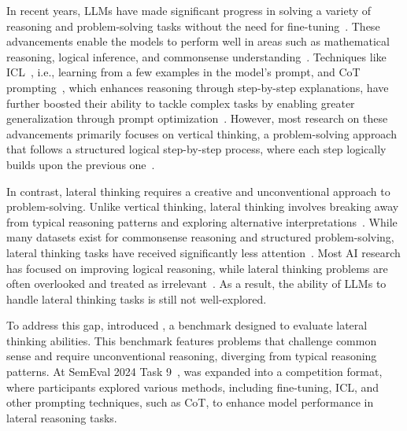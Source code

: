 In recent years, \acp{LLM} have made significant progress in solving a variety of reasoning and problem-solving tasks without the need for fine-tuning~\cite{radfordLanguageModelsAre2019}. These advancements enable the models to perform well in areas such as mathematical reasoning, logical inference, and commonsense understanding~\cite{panLogicLMEmpoweringLarge2023, qiaoReasoningLanguageModel2023, naveedComprehensiveOverviewLarge2024}. Techniques like \ac{ICL}~\cite{brownLanguageModelsAre2020}, i.e., learning from a few examples in the model's prompt, and \ac{CoT} prompting~\cite{weiChainofThoughtPromptingElicits2023}, which enhances reasoning through step-by-step explanations, have further boosted their ability to tackle complex tasks by enabling greater generalization through prompt optimization~\cite{brownLanguageModelsAre2020,weiChainofThoughtPromptingElicits2023}. However, most research on these advancements primarily focuses on vertical thinking, a problem-solving approach that follows a structured logical step-by-step process, where each step logically builds upon the previous one~\cite{jiangBRAINTEASERLateralThinking2023}.

In contrast, lateral thinking requires a creative and unconventional approach to problem-solving. Unlike vertical thinking, lateral thinking involves breaking away from typical reasoning patterns and exploring alternative interpretations~\cite{jiangBRAINTEASERLateralThinking2023, jiangSemEval2024Task92024}. While many datasets exist for commonsense reasoning and structured problem-solving, lateral thinking tasks have received significantly less attention~\cite{jiangBRAINTEASERLateralThinking2023, jiangSemEval2024Task92024}. Most AI research has focused on improving logical reasoning, while lateral thinking problems are often overlooked and treated as irrelevant~\cite{jiangBRAINTEASERLateralThinking2023, jiangSemEval2024Task92024}. As a result, the ability of \acp{LLM} to handle lateral thinking tasks is still not well-explored.

To address this gap, \textcite{jiangBRAINTEASERLateralThinking2023} introduced , a benchmark designed to evaluate lateral thinking abilities. This benchmark features problems that challenge common sense and require unconventional reasoning, diverging from typical reasoning patterns. At SemEval 2024 Task 9~\cite{jiangSemEval2024Task92024},  was expanded into a competition format, where participants explored various methods, including fine-tuning, \ac{ICL}, and other prompting techniques, such as \ac{CoT}, to enhance model performance in lateral reasoning tasks.

